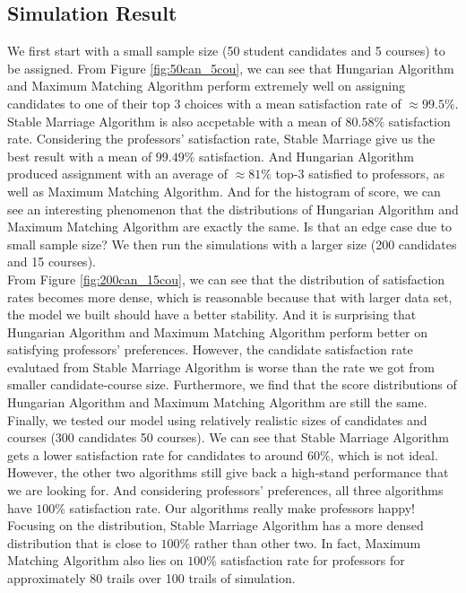 \documentclass[twoside,twocolumn]{article}
\begin{document}
    \subsection{Simulation Result}
    We first start with a small sample size (50 student candidates and 5 courses) to be assigned. From Figure \ref{fig:50can_5cou}, we can see that Hungarian Algorithm and
    Maximum Matching Algorithm perform extremely well on assigning candidates to one of their top 3 choices with a mean satisfaction rate of $\approx 99.5\%$. Stable Marriage
    Algorithm is also accpetable with a mean of $80.58\%$ satisfaction rate. Considering the professors' satisfaction rate, Stable Marriage give us the best result with
    a mean of $99.49\%$ satisfaction. And Hungarian Algorithm produced assignment with an average of $\approx 81\%$ top-3 satisfied to professors, as well as Maximum Matching
    Algorithm. And for the histogram of score, we can see an interesting phenomenon that the distributions of Hungarian Algorithm and Maximum Matching Algorithm are
    exactly the same. Is that an edge case due to small sample size? We then run the simulations with a larger size (200 candidates and 15 courses).
    \\ \indent From Figure \ref{fig:200can_15cou}, we can see that the distribution of satisfaction rates becomes more dense, which is reasonable because that with
    larger data set, the model we built should have a better stability. And it is surprising that Hungarian Algorithm and Maximum Matching Algorithm perform better on 
    satisfying professors' preferences. However, the candidate satisfaction rate evalutaed from Stable Marriage Algorithm is worse than the rate we got from smaller candidate-course
    size. Furthermore, we find that the score distributions of Hungarian Algorithm and Maximum Matching Algorithm are still the same.
    \\ \indent Finally, we tested our model using relatively realistic sizes of candidates and courses (300 candidates 50 courses). We can see that Stable Marriage Algorithm
    gets a lower satisfaction rate for candidates to around $60\%$, which is not ideal. However, the other two algorithms still give back a high-stand performance that we 
    are looking for. And considering professors' preferences, all three algorithms have $100\%$ satisfaction rate. Our algorithms really make professors happy! Focusing on the 
    distribution, Stable Marriage Algorithm has a more densed distribution that is close to $100\%$ rather than other two. In fact, Maximum Matching Algorithm also lies on 
    $100\%$ satisfaction rate for professors for approximately 80 trails over 100 trails of simulation. 
\end{document}
